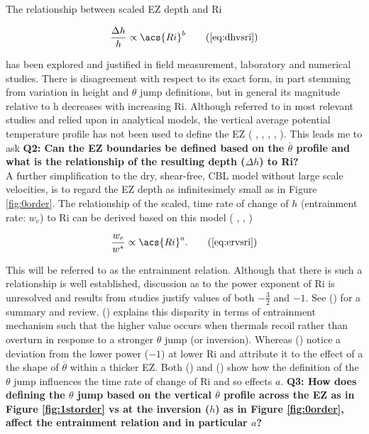 The relationship between scaled \acs{EZ} depth and \acs{Ri} 

\begin{equation} 
\frac{\Delta h}{h} \propto  \acs{Ri}^{b} \tag{\ref{eq:dhvsri}}
\end{equation}

has been explored and justified in field measurement, laboratory and numerical studies.  There is disagreement with respect to its exact form, in part stemming from variation in height and $\theta$ jump definitions, but in general its magnitude relative to h decreases with increasing \acs{Ri}. Although referred to in most relevant studies and relied upon in analytical models, the vertical average potential temperature profile has not been used to define the \acs{EZ} (\citeauthor{DearWill80} \citeyear{DearWill80}, \citeauthor{StullNelEl} \citeyear{StullNelEl}, \citeauthor{FedConzMir04} \citeyear{FedConzMir04}, \citeauthor{Boers89} \citeyear{Boers89}, \citeauthor{BrooksFowler2} \citeyear{BrooksFowler2}). This leads me to ask \textbf{Q2: Can the \acs{EZ} boundaries be defined based on the $\overline{\theta}$ profile and what is the relationship of the resulting depth ($\Delta h$) to \acs{Ri}?}\\


A further simplification to the dry, shear-free, \acs{CBL} model without large scale velocities, is to regard the \acs{EZ} depth as infinitesimely small as in Figure \ref{fig:0order}.  The relationship of the scaled, time rate of change of $h$ (entrainment rate: $w_{e}$) to \acs{Ri} can be derived based on this model (\citeauthor{Tennekes73} \citeyear{Tennekes73}, \citeauthor{Deardorff79} \citeyear{Deardorff79}, \citeauthor{FedConzMir04} \citeyear{FedConzMir04})

\begin{equation}
\frac{w_{e}}{w^{*}} \propto  \acs{Ri}^{a}.\tag{\ref{eq:ervsri}} 
\end{equation}
 
This will be referred to as the entrainment relation.  Although that there is such a relationship is well established, discussion as to the power exponent of \acs{Ri} is unresolved and results from studies justify values of both $-\frac{3}{2}$ and $-1$. See \citeauthor{Traum11} (\citeyear{Traum11}) for a summary and review.  \citeauthor{Turner86} (\citeyear{Turner86}) explains this disparity in terms of entrainment mechanism such that the higher value occurs when thermals recoil rather than overturn in response to a stronger $\theta$ jump (or inversion).  Whereas \citeauthor{SullMoengStev} (\citeyear{SullMoengStev}) notice a deviation from the lower power ($-1$) at lower \acs{Ri} and attribute it to the effect of a the shape of $\overline{\theta}$ within a thicker \acs{EZ}.  Both \citeauthor{FedConzMir04} (\citeyear{FedConzMir04}) and \citeauthor{GarciaMellado} (\citeyear{GarciaMellado}) show how the definition of the $\theta$ jump influences the time rate  of change of \acs{Ri} and so effects $a$. \textbf{Q3: How does defining the $\theta$ jump based on the vertical $\overline{\theta}$ profile across the \acs{EZ} as in Figure \ref{fig:1storder} vs at the inversion ($h$) as in Figure \ref{fig:0order}, affect the entrainment relation and in particular $a$?}\\


